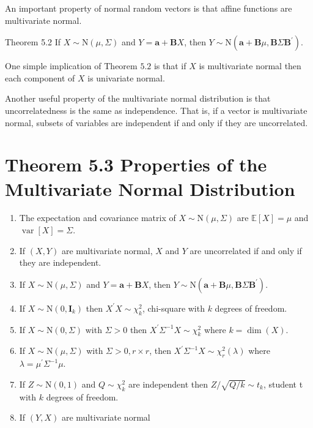 \documentclass[10pt]{article}
\begin{document}
An important property of normal random vectors is that affine functions are multivariate normal.

Theorem 5.2 If $X \sim \mathrm{N}(\mu, \Sigma)$ and $Y=\boldsymbol{a}+\boldsymbol{B} X$, then $Y \sim \mathrm{N}\left(\boldsymbol{a}+\boldsymbol{B} \mu, \boldsymbol{B} \Sigma \boldsymbol{B}^{\prime}\right)$.

One simple implication of Theorem $5.2$ is that if $X$ is multivariate normal then each component of $X$ is univariate normal.

Another useful property of the multivariate normal distribution is that uncorrelatedness is the same as independence. That is, if a vector is multivariate normal, subsets of variables are independent if and only if they are uncorrelated.

\section{Theorem 5.3 Properties of the Multivariate Normal Distribution}
\begin{enumerate}
  \item The expectation and covariance matrix of $X \sim \mathrm{N}(\mu, \Sigma)$ are $\mathbb{E}[X]=\mu$ and $\operatorname{var}[X]=\Sigma$.

  \item If $(X, Y)$ are multivariate normal, $X$ and $Y$ are uncorrelated if and only if they are independent.

  \item If $X \sim \mathrm{N}(\mu, \Sigma)$ and $Y=\boldsymbol{a}+\boldsymbol{B} X$, then $Y \sim \mathrm{N}\left(\boldsymbol{a}+\boldsymbol{B} \mu, \boldsymbol{B} \Sigma \boldsymbol{B}^{\prime}\right)$.

  \item If $X \sim \mathrm{N}\left(0, \boldsymbol{I}_{k}\right)$ then $X^{\prime} X \sim \chi_{k}^{2}$, chi-square with $k$ degrees of freedom.

  \item If $X \sim \mathrm{N}(0, \Sigma)$ with $\Sigma>0$ then $X^{\prime} \Sigma^{-1} X \sim \chi_{k}^{2}$ where $k=\operatorname{dim}(X)$.

  \item If $X \sim \mathrm{N}(\mu, \Sigma)$ with $\Sigma>0, r \times r$, then $X^{\prime} \Sigma^{-1} X \sim \chi_{r}^{2}(\lambda)$ where $\lambda=\mu^{\prime} \Sigma^{-1} \mu$.

  \item If $Z \sim \mathrm{N}(0,1)$ and $Q \sim \chi_{k}^{2}$ are independent then $Z / \sqrt{Q / k} \sim t_{k}$, student t with $k$ degrees of freedom.

  \item If $(Y, X)$ are multivariate normal

\end{enumerate}
\end{document}
